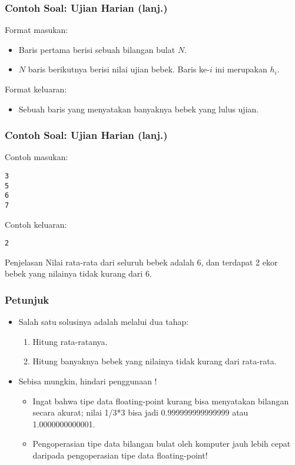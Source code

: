 \begin{frame}
\frametitle{Contoh Soal: Ujian Harian (lanj.)}
Format masukan:
\begin{itemize}
  \item Baris pertama berisi sebuah bilangan bulat $N$.
  \item $N$ baris berikutnya berisi nilai ujian bebek. Baris ke-$i$ ini merupakan $h_i$.
\end{itemize}
Format keluaran:
\begin{itemize}
  \item Sebuah baris yang menyatakan banyaknya bebek yang lulus ujian.
\end{itemize}
\end{frame}

\begin{frame}[fragile]
\frametitle{Contoh Soal: Ujian Harian (lanj.)}
Contoh masukan:
\begin{lstlisting}
3
5
6
7
\end{lstlisting}

\hfill

Contoh keluaran:
\begin{lstlisting}
2
\end{lstlisting}
\begin{block}{Penjelasan}
Nilai rata-rata dari seluruh bebek adalah 6, dan terdapat 2 ekor bebek yang nilainya tidak kurang dari 6.
\end{block}
\end{frame}

\begin{frame}
\frametitle{Petunjuk}
\begin{itemize}
  \item Salah satu solusinya adalah melalui dua tahap:
  \begin{enumerate}
    \item Hitung rata-ratanya.
    \item Hitung banyaknya bebek yang nilainya tidak kurang dari rata-rata.
  \end{enumerate}
  \item Sebisa mungkin, hindari penggunaan !
  \begin{itemize}
    \item Ingat bahwa tipe data floating-point kurang bisa menyatakan bilangan secara akurat; nilai 1/3*3 bisa jadi 0.999999999999999 atau 1.0000000000001.
    \item Pengoperasian tipe data bilangan bulat oleh komputer jauh lebih cepat daripada pengoperasian tipe data floating-point!
  \end{itemize}
\end{itemize}
\end{frame}


